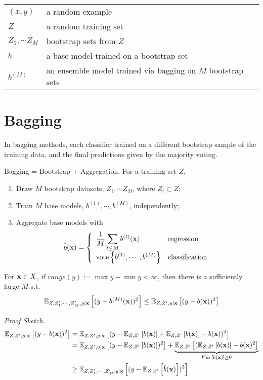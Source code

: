 \begin{tcolorbox}
\begin{tabular}{ll}
	$(x, y)$ & a random example \\
	$Z$ & a random training set \\
	$Z_1, \cdots Z_M$ & bootstrap sets from $Z$ \\
	$b$ & a base model trained on a bootstrap set \\
	$b^{(M)}$ & an ensemble model trained via bagging on $M$ bootstrap sets
\end{tabular}
\end{tcolorbox}

\section{Bagging}
In bagging methods, each classifier trained on a different bootstrap sample of the
training data, and the final predictions given by the majority voting.
\begin{definition}[Bagging]
Bagging = Bootstrap + Aggregation. For a training set $Z$,
\begin{enumerate}
	\item Draw $M$ bootstrap datasets, $Z_1, \cdots Z_M$, where $Z_i \subset Z$;
	\item Train $M$ base models, $b^{(1)}, \cdots, b^{(M)}$, independently;
	\item Aggregate base models with
	$$
	\hat{b}(\mathbf{x}) = \left\{ \begin{array}{ll} \displaystyle \frac{1}{M}\sum_{t \leq M} b^{(t)}(\mathbf{x}) & \mathrm{regression} \\ \displaystyle \mathrm{vote}\left\{ b^{(1)}, \cdots, b^{(M)} \right\} & \mathrm{classification}   \end{array} \right.
	$$
\end{enumerate}
\end{definition}
\begin{theorem}
	For $\mathbf{x} \in X$, if $range(y) := \max y - \min y < \infty$, then there is a sufficiently large $M$ s.t.
	\begin{align}
		\mathbb{E}_{Z, Z'_1,\cdots ,Z'_M, y \mid \mathbf{x}}\left[ (y - b^{(M)}(\mathbf{x}))^2 \right] \leq \mathbb{E}_{Z, Z', y \mid \mathbf{x}}\left[ (y - b(\mathbf{x}))^2 \right]
	\end{align}
\end{theorem}
\textit{Proof Sketch.} 
\begin{align}
	\mathbb{E}_{Z, Z', y \mid \mathbf{x}}\left[ (y - {b}(\mathbf{x}))^2 \right] & = \mathbb{E}_{Z, Z', y \mid \mathbf{x}}\left[ (y - \mathbb{E}_{Z,Z'}\left[ b(\mathbf{x}) \right] + \mathbb{E}_{Z,Z'}\left[ b(\mathbf{x}) \right] - b(\mathbf{x}))^2 \right] \\
	& = \mathbb{E}_{Z, Z', y\mid \mathbf{x}}\left[ (y - \mathbb{E}_{Z, Z'}\left[ b(\mathbf{x}) \right])^2 \right] + \underbrace{\mathbb{E}_{Z, Z'}\left[ (\mathbb{E}_{Z, Z'}\left[ b(\mathbf{x}) \right] - b(\mathbf{x})^2 \right]}_{Var[b(\mathbf{x})] \geq 0} \\
	& \geq \mathbb{E}_{Z, Z'_1,\cdots ,Z'_M, y\mid \mathbf{x}}\left[ (y - \mathbb{E}_{Z, Z'}\left[ \hat{b}(\mathbf{x}) \right])^2 \right]
\end{align} \myqed

